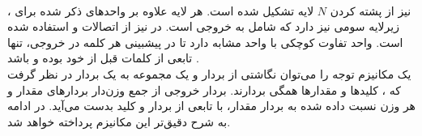 \paragraph*{\decoder{}}
\decoder{}
نیز از پشته کردن $N$ لایه تشکیل شده است. هر لایه علاوه بر واحد‌های ذکر شده برای \encoder{}، زیرلایه سومی نیز دارد که شامل
به خروجی \encoder{} است. در \decoder{} نیز از اتصالات \residual{} و \layernormalization{} استفاده شده است. واحد \multiheadselfattention{} تفاوت کوچکی با واحد مشابه \encoder{} دارد تا در پیشبینی هر کلمه در خروجی، تنها تابعی از کلمات قبل از خود بوده و \autoregressive{} باشد \cite{transformer}.
\\
یک مکانیزم توجه را می‌توان نگاشتی از بردار
و یک مجموعه \keyvaluepair{} به یک بردار در نظر گرفت که \query{}، کلیدها و مقدارها همگی بردارند. بردار خروجی از جمع وزن‌دار بردارهای مقدار و هر وزن نسبت داده شده به بردار مقدار، با تابعی از بردار \query{} و کلید بدست می‌آید. در ادامه به شرح دقیق‌تر این مکانیزم پرداخته خواهد شد.
